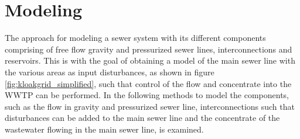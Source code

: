 \chapter{Modeling}\label{se:modeling}

The approach for modeling a sewer system with its different components comprising of free flow gravity and pressurized sewer lines, interconnections and reservoirs. This is with the goal of obtaining a model of the main sewer line with the various areas as input disturbances, as shown in figure \ref{fig:kloakgrid_simplified}, such that control of the flow and concentrate into the WWTP can be performed. In the following methods to model the components, such as the flow in gravity and pressurized sewer line, interconnections such that disturbances can be added to the main sewer line and the concentrate of the wastewater flowing in the main sewer line, is examined.








